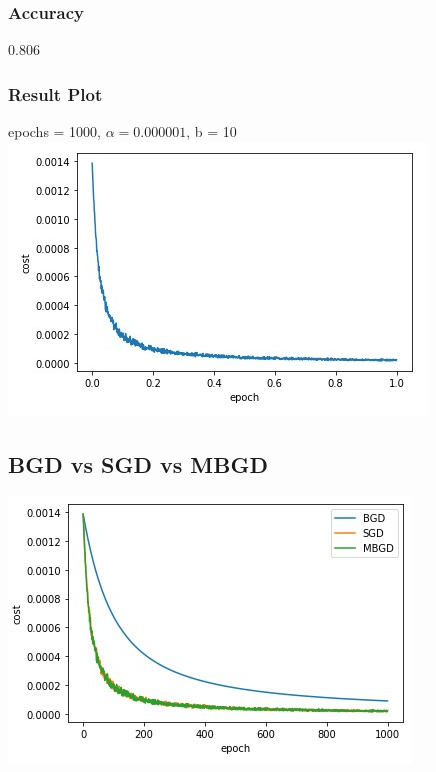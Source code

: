 \documentclass[10pt]{article}
\begin{document}
\subsubsection{Accuracy}
    0.806
    
\subsubsection{Result Plot}
epochs = 1000, $\alpha = 0.000001$, b  = 10\\

\includegraphics[scale=.6]{log_mini}


\subsection{BGD vs SGD vs MBGD}

\includegraphics[scale=.8]{log}
\end{document}
